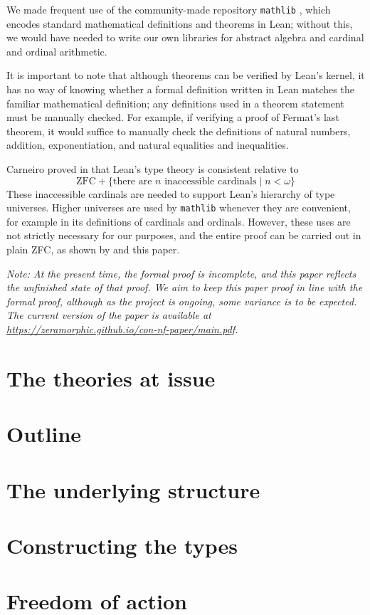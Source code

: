 \documentclass{article}
\theoremstyle{definition}
\theoremstyle{remark}
\begin{document}
We made frequent use of the community-made repository \texttt{mathlib} \cite{mathlib2020}, which encodes standard mathematical definitions and theorems in Lean; without this, we would have needed to write our own libraries for abstract algebra and cardinal and ordinal arithmetic.

It is important to note that although theorems can be verified by Lean's kernel, it has no way of knowing whether a formal definition written in Lean matches the familiar mathematical definition; any definitions used in a theorem statement must be manually checked.
For example, if verifying a proof of Fermat's last theorem, it would suffice to manually check the definitions of natural numbers, addition, exponentiation, and natural equalities and inequalities.

Carneiro proved in \cite{leantt} that Lean's type theory is consistent relative to
\[ \text{ZFC} + \{ \text{there are } n \text{ inaccessible cardinals} \mid n < \omega \} \]
These inaccessible cardinals are needed to support Lean's hierarchy of type universes.
Higher universes are used by \texttt{mathlib} whenever they are convenient, for example in its definitions of cardinals and ordinals.
However, these uses are not strictly necessary for our purposes, and the entire proof can be carried out in plain ZFC, as shown by \cite{holmes2023nf} and this paper.

\emph{%
	Note: At the present time, the formal proof \cite{leanprover-community-con-nf} is incomplete, and this paper reflects the unfinished state of that proof.
	We aim to keep this paper proof in line with the formal proof, although as the project is ongoing, some variance is to be expected.
	The current version of the paper is available at \url{https://zeramorphic.github.io/con-nf-paper/main.pdf}.
}

\section{The theories at issue}
\label{sec:theories}


\section{Outline}
\label{sec:outline}


\section{The underlying structure}
\label{sec:structure}


\section{Constructing the types}
\label{sec:construction}


\section{Freedom of action}
\label{sec:foa}


\printbibliography
\end{document}
